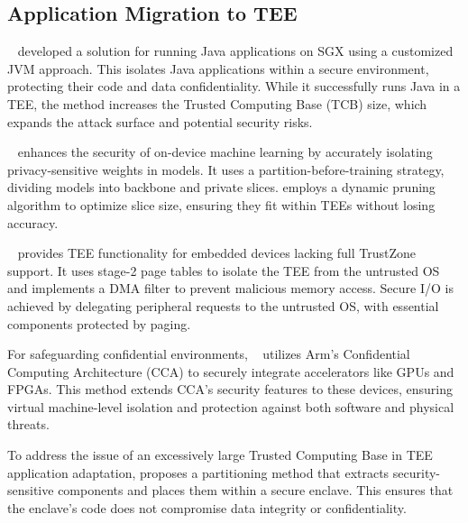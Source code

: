 \subsection{Application Migration to TEE}
~\cite{miao2023lejacon} developed a solution for running Java applications on SGX using a customized JVM approach. This isolates Java applications within a secure environment, protecting their code and data confidentiality.
While it successfully runs Java in a TEE, the method increases the Trusted Computing Base (TCB) size, which expands the attack surface and potential security risks.

~\cite{zhang2024no} enhances the security of on-device machine learning by accurately isolating privacy-sensitive weights in models. It uses a partition-before-training strategy, dividing models into backbone and private slices.  employs a dynamic pruning algorithm to optimize slice size, ensuring they fit within TEEs without losing accuracy.

~\cite{han2023mytee} provides TEE functionality for embedded devices lacking full TrustZone support. It uses stage-2 page tables to isolate the TEE from the untrusted OS and implements a DMA filter to prevent malicious memory access. Secure I/O is achieved by delegating peripheral requests to the untrusted OS, with essential components protected by paging.

For safeguarding confidential environments, ~\cite{Supraja294554} utilizes Arm's Confidential Computing Architecture (CCA) to securely integrate accelerators like GPUs and FPGAs. This method extends CCA's security features to these devices, ensuring virtual machine-level isolation and protection against both software and physical threats.


To address the issue of an excessively large Trusted Computing Base in TEE application adaptation, \citet{lind2017glamdring} proposes a partitioning method that extracts security-sensitive components and places them within a secure enclave. This ensures that the enclave's code does not compromise data integrity or confidentiality.

